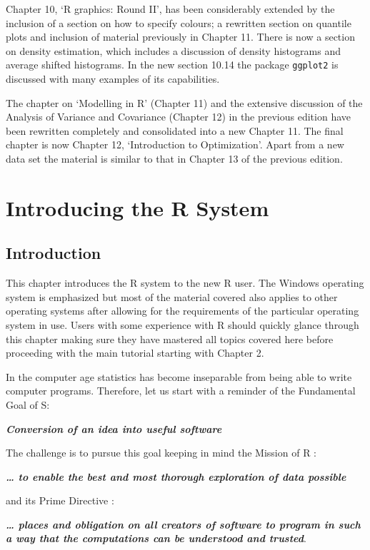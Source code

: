\documentclass[
]{book}
\begin{document}
Chapter 10, `R graphics: Round II', has been considerably extended by the inclusion of a section on how to specify colours; a rewritten section on quantile plots and inclusion of material previously in Chapter 11. There is now a section on density estimation, which includes a discussion of density histograms and average shifted histograms. In the new section 10.14 the package \texttt{ggplot2} is discussed with many examples of its capabilities.

The chapter on `Modelling in R' (Chapter 11) and the extensive discussion of the Analysis of Variance and Covariance (Chapter 12) in the previous edition have been rewritten completely and consolidated into a new Chapter 11. The final chapter is now Chapter 12, `Introduction to Optimization'. Apart from a new data set the material is similar to that in Chapter 13 of the previous edition.

\chapter{Introducing the R System}\label{intro}

\section{Introduction}\label{introduction}

This chapter introduces the R system to the new R user. The Windows operating system is emphasized but most of the material covered also applies to other operating systems after allowing for the requirements of the particular operating system in use. Users with some experience with R should quickly glance through this chapter making sure they have mastered all topics covered here before proceeding with the main tutorial starting with Chapter 2.

In the computer age statistics has become inseparable from being able to write computer programs. Therefore, let us start with a reminder of the Fundamental Goal of S:

\textbf{\emph{Conversion of an idea into useful software}}

The challenge is to pursue this goal keeping in mind the Mission of R \citep{Chambers2008}:

\textbf{\emph{\ldots{} to enable the best and most thorough exploration of data possible}}

and its Prime Directive \citep{Chambers2008}:

\textbf{\emph{\ldots{} places and obligation on all creators of software to program in such a way that the computations can be understood and trusted}}.
\end{document}
